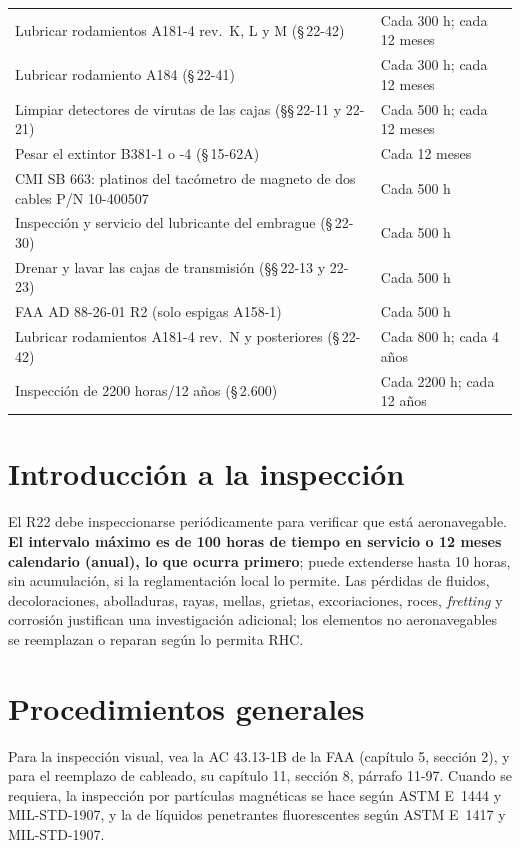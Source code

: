 \begin{table}[htbp]
\begin{tabularx}{\linewidth}{@{}Y>{\raggedright\arraybackslash}p{2.7cm}@{}}
Lubricar rodamientos A181-4 rev.~K, L y M (\S\,22-42) & Cada 300 h; cada 12 meses \\
Lubricar rodamiento A184 (\S\,22-41) & Cada 300 h; cada 12 meses \\
Limpiar detectores de virutas de las cajas (\S\S\,22-11 y 22-21) & Cada 500 h; cada 12 meses \\
Pesar el extintor B381-1 o -4 (\S\,15-62A) & Cada 12 meses \\
CMI SB 663: platinos del tacómetro de magneto de dos cables P/N 10-400507 & Cada 500 h \\
Inspección y servicio del lubricante del embrague (\S\,22-30) & Cada 500 h \\
Drenar y lavar las cajas de transmisión (\S\S\,22-13 y 22-23) & Cada 500 h \\
FAA AD 88-26-01 R2 (solo espigas A158-1) & Cada 500 h \\
Lubricar rodamientos A181-4 rev.~N y posteriores (\S\,22-42) & Cada 800 h; cada 4 años \\
Inspección de 2200 horas/12 años (\S\,2.600) & Cada 2200 h; cada 12 años \\
\bottomrule
\end{tabularx}
\end{table}

\section{Introducción a la inspección}

El R22 debe inspeccionarse periódicamente para verificar que está aeronavegable. \textbf{El intervalo máximo es de 100 horas de tiempo en servicio o 12 meses calendario (anual), lo que ocurra primero}; puede extenderse hasta 10 horas, sin acumulación, si la reglamentación local lo permite. Las pérdidas de fluidos, decoloraciones, abolladuras, rayas, mellas, grietas, excoriaciones, roces, \emph{fretting} y corrosión justifican una investigación adicional; los elementos no aeronavegables se reemplazan o reparan según lo permita RHC.

\section{Procedimientos generales}

Para la inspección visual, vea la AC 43.13-1B de la FAA (capítulo 5, sección 2), y para el reemplazo de cableado, su capítulo 11, sección 8, párrafo 11-97. Cuando se requiera, la inspección por partículas magnéticas se hace según ASTM E~1444 y MIL-STD-1907, y la de líquidos penetrantes fluorescentes según ASTM E~1417 y MIL-STD-1907.

